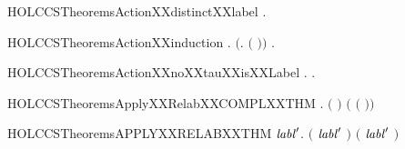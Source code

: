 \newcommand{\HOLCCSTheoremsActionXXdistinct}{\UseVerbatim{HOLCCSTheoremsActionXXdistinct}}
\begin{SaveVerbatim}{HOLCCSTheoremsActionXXdistinctXXlabel}
\HOLTokenTurnstile{} \HOLSymConst{\HOLTokenForall{}}.   \HOLSymConst{\HOLTokenNotEqual{}} \HOLConst{\ensuremath{\tau}}
\end{SaveVerbatim}
\newcommand{\HOLCCSTheoremsActionXXdistinctXXlabel}{\UseVerbatim{HOLCCSTheoremsActionXXdistinctXXlabel}}
\begin{SaveVerbatim}{HOLCCSTheoremsActionXXinduction}
\HOLTokenTurnstile{} \HOLSymConst{\HOLTokenForall{}}.  \HOLConst{\ensuremath{\tau}} \HOLSymConst{\HOLTokenConj{}} \ensuremath{(}\HOLSymConst{\HOLTokenForall{}}.  \ensuremath{(} \ensuremath{)}\ensuremath{)} \HOLSymConst{\HOLTokenImp{}} \HOLSymConst{\HOLTokenForall{}}.  
\end{SaveVerbatim}
\newcommand{\HOLCCSTheoremsActionXXinduction}{\UseVerbatim{HOLCCSTheoremsActionXXinduction}}
\begin{SaveVerbatim}{HOLCCSTheoremsActionXXnoXXtauXXisXXLabel}
\HOLTokenTurnstile{} \HOLSymConst{\HOLTokenForall{}}.  \HOLSymConst{\HOLTokenNotEqual{}} \HOLConst{\ensuremath{\tau}} \HOLSymConst{\HOLTokenImp{}} \HOLSymConst{\HOLTokenExists{}}.  \HOLSymConst{\ensuremath{=}}  
\end{SaveVerbatim}
\newcommand{\HOLCCSTheoremsActionXXnoXXtauXXisXXLabel}{\UseVerbatim{HOLCCSTheoremsActionXXnoXXtauXXisXXLabel}}
\begin{SaveVerbatim}{HOLCCSTheoremsApplyXXRelabXXCOMPLXXTHM}
\HOLTokenTurnstile{} \HOLSymConst{\HOLTokenForall{}} .
       \ensuremath{(} \ensuremath{)} \HOLSymConst{\ensuremath{=}}
      \ensuremath{(}  \ensuremath{(} \ensuremath{)}\ensuremath{)}
\end{SaveVerbatim}
\newcommand{\HOLCCSTheoremsApplyXXRelabXXCOMPLXXTHM}{\UseVerbatim{HOLCCSTheoremsApplyXXRelabXXCOMPLXXTHM}}
\begin{SaveVerbatim}{HOLCCSTheoremsAPPLYXXRELABXXTHM}
\HOLTokenTurnstile{} \HOLSymConst{\HOLTokenForall{}} \ensuremath{\HOLBoundVar{labl}\sp{\prime{}}}.
     \ensuremath{(} \ensuremath{\HOLBoundVar{labl}\sp{\prime{}}} \HOLSymConst{\ensuremath{=}}  \ensuremath{)} \HOLSymConst{\HOLTokenEquiv{}}
     \ensuremath{(} \ensuremath{\HOLBoundVar{labl}\sp{\prime{}}} \HOLSymConst{\ensuremath{=}}  \ensuremath{)}
\end{SaveVerbatim}
